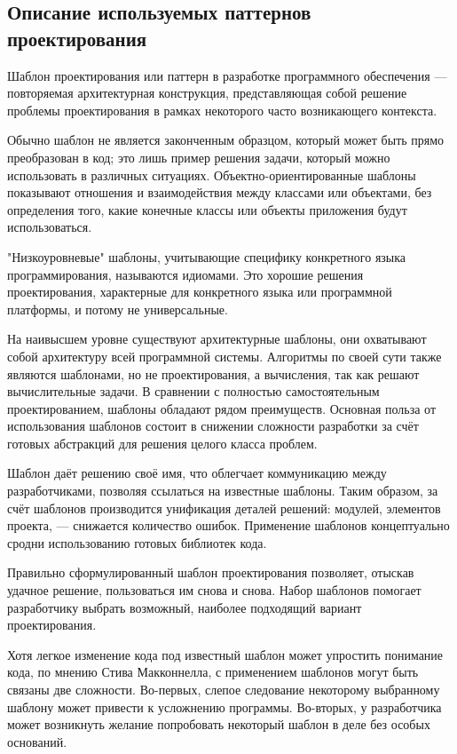 \subsection{Описание используемых паттернов проектирования}
\label{sec:modeling:patterns}

Шаблон проектирования или паттерн в разработке программного обеспечения — повторяемая архитектурная конструкция, представляющая собой решение проблемы проектирования в рамках некоторого часто возникающего контекста.

Обычно шаблон не является законченным образцом, который может быть прямо преобразован в код; это лишь пример решения задачи, который можно использовать в различных ситуациях. Объектно-ориентированные шаблоны показывают отношения и взаимодействия между классами или объектами, без определения того, какие конечные классы или объекты приложения будут использоваться.

"Низкоуровневые" шаблоны, учитывающие специфику конкретного языка программирования, называются идиомами. Это хорошие решения проектирования, характерные для конкретного языка или программной платформы, и потому не универсальные.

На наивысшем уровне существуют архитектурные шаблоны, они охватывают собой архитектуру всей программной системы. Алгоритмы по своей сути также являются шаблонами, но не проектирования, а вычисления, так как решают вычислительные задачи. В сравнении с полностью самостоятельным проектированием, шаблоны обладают рядом преимуществ. Основная польза от использования шаблонов состоит в снижении сложности разработки за счёт готовых абстракций для решения целого класса проблем. 

Шаблон даёт решению своё имя, что облегчает коммуникацию между разработчиками, позволяя ссылаться на известные шаблоны. Таким образом, за счёт шаблонов производится унификация деталей решений: модулей, элементов проекта, — снижается количество ошибок. Применение шаблонов концептуально сродни использованию готовых библиотек кода.

Правильно сформулированный шаблон проектирования позволяет, отыскав удачное решение, пользоваться им снова и снова. Набор шаблонов помогает разработчику выбрать возможный, наиболее подходящий вариант проектирования. 

Хотя легкое изменение кода под известный шаблон может упростить понимание кода, по мнению Стива Макконнелла, с применением шаблонов могут быть связаны две сложности. Во-первых, слепое следование некоторому выбранному шаблону может привести к усложнению программы. Во-вторых, у разработчика может возникнуть желание попробовать некоторый шаблон в деле без особых оснований. 

